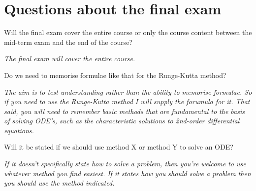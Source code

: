 \section{Questions about the final exam}

Will the final exam cover the entire course or only the course content between the mid-term exam and the end of the course?

\emph{The final exam will cover the entire course.}

Do we need to memorise formulae like that for the Runge-Kutta method?

\emph{The aim is to test understanding rather than the ability to memorise formulae. So if you need to use the Runge-Kutta method I will supply the forumula for it. That said, you will need to remember basic methods that are fundamental to the basis of solving ODE's, such as the characteristic solutions to 2nd-order differential equations.}

Will it be stated if we should use method X or method Y to solve an ODE?

\emph{If it doesn't specifically state how to solve a problem, then you're welcome to use whatever method you find easiest. If it states how you should solve a problem then you should use the method indicated.}
